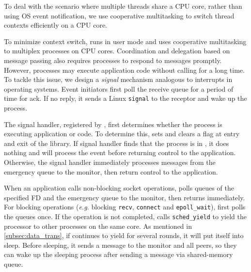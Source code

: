 To deal with the scenario where multiple threads share a CPU core, rather than using OS event notification, we use cooperative multitasking to switch thread contexts efficiently on a CPU core.


To minimize context switch, \sys{} runs in user mode and uses cooperative multitasking to multiplex processes on CPU cores. Coordination and delegation based on message passing also requires processes to respond to messages promptly. However, processes may execute application code without calling \libipc{} for a long time. To tackle this issue, we design a \textit{signal} mechanism analogous to interrupts in operating systems. Event initiators  first poll the receive queue for a period of time for ack. If no reply, it sends a Linux \texttt{signal} to the receptor and wake up the process.

The signal handler, registered by \libipc{}, first determines whether the process is executing application or \libipc{} code. To determine this, \libipc{} sets and clears a flag at entry and exit of the library. If signal handler finds that the process is in \libipc, it does nothing and \libipc{} will process the event before returning control to the application. Otherwise, the signal handler immediately processes messages from the emergency queue to the monitor, then return control to the application. 

When an application calls non-blocking socket operations, \libipc{} polls queues of the specified FD and the emergency queue to the monitor, then returns immediately. For blocking operations (\textit{e.g.} blocking \texttt{recv}, \texttt{connect} and \texttt{epoll\_wait}), \libipc{} first polls the queues once. If the operation is not completed, \libipc{} calls \texttt{sched\_yield} to yield the processor to other processes on the same core. %
As mentioned in \ref{subsec:data_trans}, if \libipc{} continues to yield for several rounds, it will put itself into sleep. Before sleeping, it sends a message to the monitor and all peers, so they can wake up the sleeping process after sending a message via shared-memory queue.

